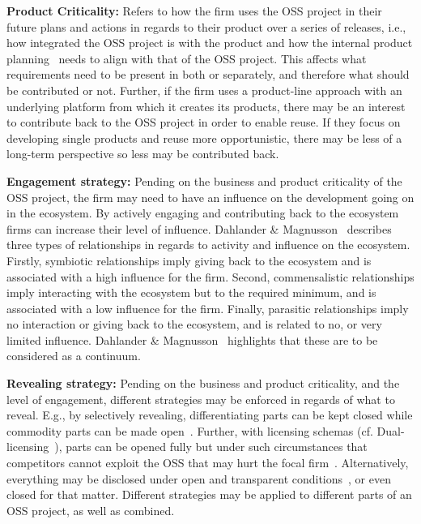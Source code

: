 \documentclass[a4paper]{llncs}
\begin{document}
\noindent\textbf{Product Criticality:} Refers to how the firm uses the OSS project in their future plans and actions in regards to their product over a series of releases, i.e., how integrated the OSS project is with the product and how the internal product planning~\cite{fricker2012software} needs to align with that of the OSS project. This affects what requirements need to be present in both or separately, and therefore what should be contributed or not. Further, if the firm uses a product-line approach with an underlying platform from which it creates its products, there may be an interest to contribute back to the OSS project in order to enable reuse. If they focus on developing single products and reuse more opportunistic, there may be less of a long-term perspective so less may be contributed back. 

\noindent\textbf{Engagement strategy:} Pending on the business and product criticality of the OSS project, the firm may need to have an influence on the development going on in the ecosystem. By actively engaging and contributing back to the ecosystem firms can increase their level of influence. Dahlander \& Magnusson~\cite{dahlander2005relationships} describes three types of relationships in regards to activity and influence on the ecosystem. Firstly, symbiotic relationships imply giving back to the ecosystem and is associated with a high influence for the firm. Second, commensalistic relationships imply interacting with the ecosystem but to the required minimum, and is associated with a low influence for the firm. Finally, parasitic relationships imply no interaction or giving back to the ecosystem, and is related to no, or very limited influence. Dahlander \& Magnusson~\cite{dahlander2005relationships} highlights that these are to be considered as a continuum. 

\noindent\textbf{Revealing strategy:} Pending on the business and product criticality, and the level of engagement, different strategies may be enforced in regards of what to reveal. E.g., by selectively revealing, differentiating parts can be kept closed while commodity parts can be made open~\cite{henkel2006selective, van2009commodification}. Further, with licensing schemas (cf. Dual-licensing~\cite{chesbrough2007open}), parts can be opened fully but under such circumstances that competitors cannot exploit the OSS that may hurt the focal firm~\cite{west2003open}. Alternatively, everything may be disclosed under open and transparent conditions~\cite{chesbrough2007open}, or even closed for that matter. Different strategies may be applied to different parts of an OSS project, as well as combined. 
\end{document}
